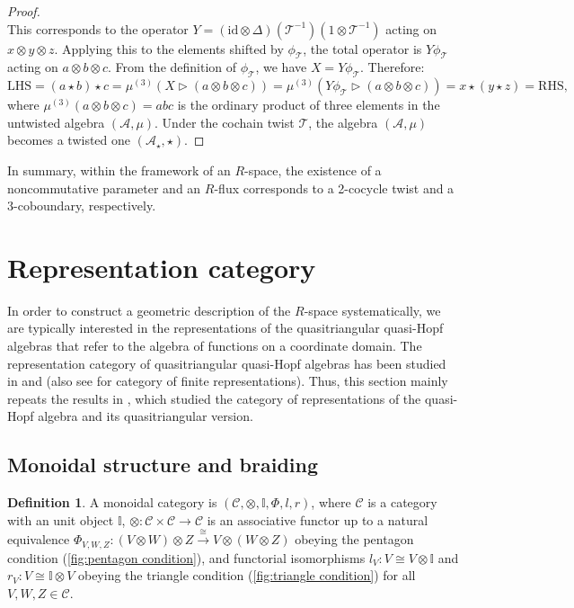 \documentclass[reqno]{amsart}
\theoremstyle{definition}
\newtheorem{definition}[formula]{Definition}
\theoremstyle{remark}
\begin{document}
\begin{proof}
\begin{equation}
\end{equation}
This corresponds to the operator $Y = (\text{id} \otimes \Delta)(\mathcal{T}^{-1}) (1 \otimes \mathcal{T}^{-1})$ acting on $x\otimes y \otimes z$.
Applying this to the elements shifted by $\phi_\mathcal{T}$, the total operator is $Y \phi_\mathcal{T}$ acting on $a\otimes b \otimes c$.
From the definition of $\phi_\mathcal{T}$, we have $X = Y  \phi_\mathcal{T}$. Therefore:
\begin{equation}
\text{LHS}=(a \star b) \star c = \mu^{(3)} (X \triangleright (a \otimes b \otimes c)) = \mu^{(3)} (Y  \phi_\mathcal{T} \triangleright (a \otimes b \otimes c)) = x \star (y \star z) = \text{RHS},
\end{equation}
where $\mu^{(3)} (a\otimes b\otimes c) = abc$ is the ordinary product of three elements in the untwisted algebra $(\mathscr{A},\mu)$. Under the cochain twist $\mathcal{T}$, the algebra $(\mathscr{A},\mu)$ becomes a twisted one $(\mathscr{A}_\star,\star)$.
\end{proof}

In summary, within the framework of an $R$-space, the existence of a noncommutative parameter and an $R$-flux corresponds to a 2-cocycle twist and a 3-coboundary, respectively.

\section{Representation category}\label{sec:Representation category}
In order to construct a geometric description of the $R$-space systematically, we are typically interested in the representations of the quasitriangular quasi-Hopf algebras that refer to the algebra of functions on a coordinate domain. The representation category of quasitriangular quasi-Hopf algebras has been studied in \cite{barnes2015nonassociative} and \cite[Chapter~9]{majid2000foundations} (also see \cite[Chapter~5]{etingof2015tensor} for category of finite representations). Thus, this section mainly repeats the results in \cite{barnes2015nonassociative}, which studied the category of representations of the quasi-Hopf algebra and its quasitriangular version. 

\subsection{Monoidal structure and braiding}
\begin{definition}
    A monoidal category is $\left(\mathcal{C},\otimes,\mathbb{I},\Phi,l,r\right)$, where $\mathcal{C}$ is a category with an unit object $\mathbb{I}$, $\otimes: \mathcal{C}\times \mathcal{C}\longrightarrow \mathcal{C}$ is an associative functor up to a natural equivalence $\Phi_{V,W,Z}:(V\otimes W)\otimes Z \mathop{\longrightarrow} \limits^{\cong}   V\otimes(W\otimes Z)$ obeying the pentagon condition (\cref{fig:pentagon condition}), and functorial isomorphisms $l_V:V \cong V\otimes\mathbb{I}$ and $r_V:V \cong \mathbb{I}\otimes V$ obeying the triangle condition (\cref{fig:triangle condition}) for all $V,W,Z \in \mathcal{C}$.
\end{definition}
\end{document}
